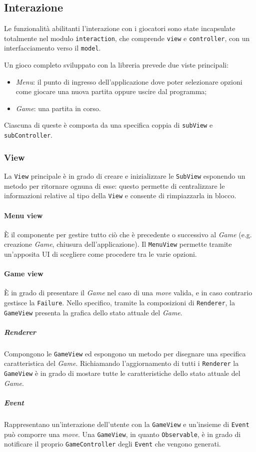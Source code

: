 
\subsection{Interazione}

Le funzionalità abilitanti l'interazione con i giocatori sono state incapsulate totalmente nel modulo \texttt{interaction}, che comprende \texttt{view} e \texttt{controller}, con un interfacciamento verso il \texttt{model}.

Un gioco completo sviluppato con la libreria prevede due viste principali:
\begin{itemize}
    \item \textit{Menu}: il punto di ingresso dell'applicazione dove poter selezionare opzioni come giocare una nuova partita oppure uscire dal programma;
    \item \textit{Game}: una partita in corso.
\end{itemize}
%
Ciascuna di queste è composta da una specifica coppia di \texttt{subView} e \texttt{subController}.
%

\subsubsection{View}
La \texttt{View} principale è in grado di creare e inizializzare le \texttt{SubView} esponendo un metodo per ritornare ognuna di esse: questo permette di centralizzare le informazioni relative al tipo della \texttt{View} e consente di rimpiazzarla in blocco. %
\paragraph{Menu view} 
%
È il componente per gestire tutto ciò che è precedente o successivo al \textit{Game} (e.g. creazione \textit{Game}, chiusura dell'applicazione).
%
Il \texttt{MenuView} permette tramite un'apposita UI di scegliere come procedere tra le varie opzioni.
\paragraph{Game view} 
%
È in grado di presentare il \textit{Game} nel caso di una \textit{move} valida, e in caso contrario gestisce la \texttt{Failure}.
%
Nello specifico, tramite la composizioni di \texttt{Renderer}, la \texttt{GameView} presenta la grafica dello stato attuale del \textit{Game}.
\subparagraph{Renderer}
%
Compongono le \texttt{GameView} ed espongono un metodo per disegnare una specifica caratteristica del \textit{Game}.
%
Richiamando l'aggiornamento di tutti i \texttt{Renderer} la \texttt{GameView} è in grado di mostare tutte le caratteristiche dello stato attuale del \textit{Game}.
\subparagraph{Event}
%
Rappresentano un'interazione dell'utente con la \texttt{GameView} e un'insieme di \texttt{Event} può comporre una \textit{move}.
%
Una \texttt{GameView}, in quanto \texttt{Observable}, è in grado di notificare il proprio \texttt{GameController} degli \texttt{Event} che vengono generati.

